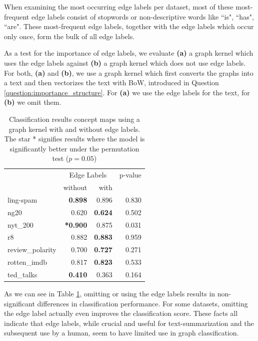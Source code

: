 When examining the most occurring edge labels per dataset, most of these most-frequent edge labels consist of stopwords or non-descriptive words like ``is", ``has", ``are".
These most-frequent edge labels, together with the edge labels which occur only once, form the bulk of all edge labels.

As a test for the importance of edge labels, we evaluate \textbf{(a)} a graph kernel which uses the edge labels against \textbf{(b)} a graph kernel which does not use edge labels.
For both, \textbf{(a)} and \textbf{(b)}, we use a graph kernel which first converts the graphs into a text and then vectorizes the text with BoW, introduced in Question \ref{question:importance_structure}.
For \textbf{(a)} we use the edge labels for the text, for \textbf{(b)} we omit them.

\begin{table}[htb!]
	\centering
\begin{tabular}{lrrr}
\toprule
	{} & \multicolumn{2}{c}{Edge Labels}  & p-value \\
	{}	& without & with & {} \\
	\midrule
		ling-spam       & \textbf{0.898} & 0.896 & 0.830 \\
		ng20            & 0.620 & \textbf{0.624} & 0.502 \\
		nyt\_200         & \textbf{*0.900} & 0.875 & 0.031 \\
		r8              & 0.882 & \textbf{0.883} & 0.959 \\
		review\_polarity & 0.700 & \textbf{0.727} & 0.271 \\
		rotten\_imdb     & 0.817 & \textbf{0.823} & 0.533 \\
		ted\_talks       & \textbf{0.410} & 0.363 & 0.164 \\
	\bottomrule
\end{tabular}
\caption[Results: Graph Kernel with and without edge labels]{Classification results concept maps using a graph kernel with and without edge labels.  The star * signifies results where the model is significantly better under the permutation test ($p = 0.05$)}\label{table:edge_label_classification}
\end{table}

As we can see in Table \ref{table:edge_label_classification}, omitting or using the edge labels results in non-significant differences in classification performance.
For some datasets, omitting the edge label actually even improves the classification score.
These facts all indicate that edge labels, while crucial and useful for text-summarization and the subsequent use by a human, seem to have limited use in graph classification.

